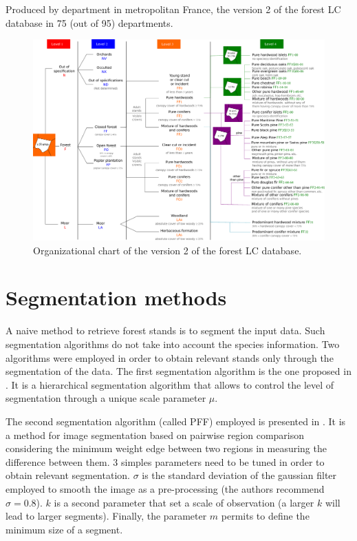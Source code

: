 Produced by department in metropolitan France, the version 2 of the forest LC database in 75 (out of 95) departments.

\begin{figure}[htbp]
\begin{center}
\includegraphics[width=\textwidth]{Figures/v2_organigram}
\caption{Organizational chart of the version 2 of the forest LC database.}
\label{fig:organigram_BD}
\end{center}
\end{figure}


\section{Segmentation methods}
A naive method to retrieve forest stands is to segment the input data. Such segmentation algorithms do not take into account the species information. Two algorithms were employed in order to obtain relevant stands only through the segmentation of the data.
The first segmentation algorithm is the one proposed in \cite{guigues2006scale}. It is a hierarchical segmentation algorithm that allows to control the level of segmentation through a unique scale parameter $\mu$.

The second segmentation algorithm (called PFF) employed is presented in \cite{felzenszwalb2004efficient}. It is a method for image segmentation based on pairwise region comparison considering the minimum weight edge between two regions in measuring the difference between them. 3 simples parameters need to be tuned in order to obtain relevant segmentation. $\sigma$ is the standard deviation of the gaussian filter employed to smooth the image as a pre-processing (the authors recommend $\sigma=0.8$). $k$ is a second parameter that set a scale of observation (a larger $k$ will lead to larger segments). Finally, the parameter $m$ permits to define the minimum size of a segment.

